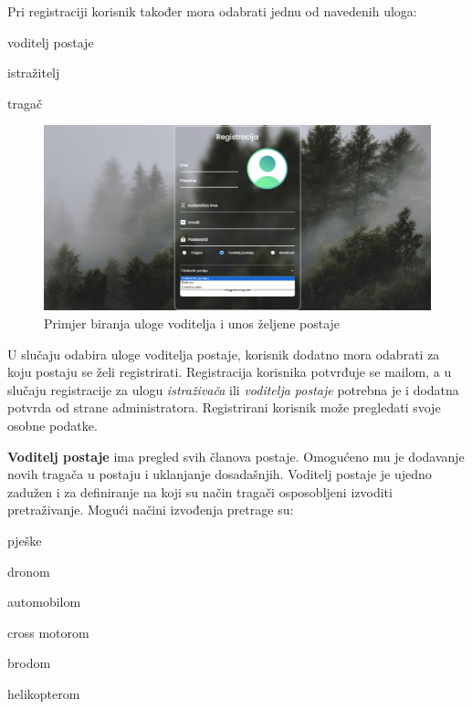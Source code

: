 		Pri registraciji korisnik također mora odabrati jednu od navedenih uloga:
		\begin{packed_item}
			\item voditelj postaje
			\item istražitelj
			\item tragač
		\end{packed_item}
		
		\begin{figure}[H]
			\includegraphics[scale=0.7]{slike/biranje_uloge.PNG} %
			\centering
			\caption{Primjer biranja uloge voditelja i unos željene postaje}
			\label{fig:promjene}
		\end{figure}
		
		U slučaju odabira uloge voditelja postaje, korisnik dodatno mora odabrati za koju postaju se želi registrirati.
		Registracija korisnika potvrđuje se mailom, a u slučaju registracije za ulogu \textit{istraživača} ili \textit{voditelja postaje} potrebna je i dodatna potvrda od strane administratora.
		Registrirani korisnik može pregledati svoje osobne podatke.
		
		\textbf{Voditelj postaje} ima pregled svih članova postaje. Omogućeno mu je dodavanje novih tragača u postaju i uklanjanje dosadašnjih. Voditelj postaje je ujedno zadužen i za definiranje na koji su način tragači osposobljeni izvoditi pretraživanje. Mogući načini izvođenja pretrage su:
		
		\begin{packed_item}
			\item pješke
			\item dronom
			\item automobilom
			\item cross motorom
			\item brodom
			\item helikopterom
		\end{packed_item}
		
